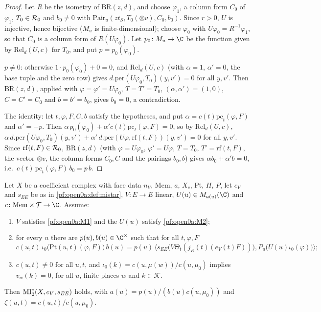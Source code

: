 \begin{proof}
Let $R$ be the isometry of $\mathrm{BR}(z,d)$, and choose $\varphi_1$, a column form $C_0$ of $\varphi_1$,
$T_0\in\mathcal{R}_0$ and $b_0\ne0$ with $\mathrm{Pair}_u(zt_S,T_0(\otimes v),C_0,b_0)$. Since $r>0$, $U$ is injective,
hence bijective ($M_u$ is finite-dimensional); choose $\varphi_0$ with $U\varphi_0=R^{-1}\varphi_1$, so that $C_0$ is a
column form of $R(U\varphi_0)$. Let $p_0\colon M_u\to\C$ be the function given by $\mathrm{Rel}_d(U,c)$ for $T_0$, and
put $p=p_0(\varphi_0)$.

$p\ne0$: otherwise $1\cdot p_0(\varphi_0)+0=0$, and $\mathrm{Rel}_d(U,c)$ (with $\alpha=1$, $\alpha'=0$, the base tuple
and the zero row) gives $d.\mathrm{per}(U\varphi_0,T_0)(y,v')=0$ for all $y,v'$. Then $\mathrm{BR}(z,d)$, applied with
$\varphi=\varphi'=U\varphi_0$, $T=T'=T_0$, $(\alpha,\alpha')=(1,0)$, $C=C'=C_0$ and $b=b'=b_0$, gives $b_0=0$, a
contradiction.

The identity: let $t,\varphi,F,C,b$ satisfy the hypotheses, and put $\alpha=c(t)\mathrm{pc}_t(\varphi,F)$ and
$\alpha'=-p$. Then $\alpha\,p_0(\varphi_0)+\alpha'c(t)\mathrm{pc}_t(\varphi,F)=0$, so by $\mathrm{Rel}_d(U,c)$,
$\alpha\,d.\mathrm{per}(U\varphi_0,T_0)(y,v')+\alpha'\,d.\mathrm{per}(U\varphi,\mathrm{rf}(t,F))(y,v')=0$ for all $y,v'$.
Since $\mathrm{rf}(t,F)\in\mathcal{R}_0$, $\mathrm{BR}(z,d)$ (with $\varphi=U\varphi_0$, $\varphi'=U\varphi$, $T=T_0$,
$T'=\mathrm{rf}(t,F)$, the vector $\otimes v$, the column forms $C_0,C$ and the pairings $b_0,b$) gives
$\alpha b_0+\alpha'b=0$, i.e.\ $c(t)\,\mathrm{pc}_t(\varphi,F)\,b_0=p\,b$.
\end{proof}

\begin{lemma}[Normalisation]\label{pf:open0a:anchored}
Let $X$ be a coefficient complex with face data $n_V$, $\mathrm{Mem}$, $a$, $X_c$, $\mathrm{Pt}$, $H$, $P$, let $e_V$
and $s_{EE}$ be as in \cref{pf:open0a:def:mistar}, $V\colon E\to E$ linear, $U(u)\in M_{a(u)}(\C)$ and
$c\colon\mathrm{Mem}\times\mathcal T\to\C$. Assume:
\begin{enumerate}[label=(\roman*)]
\item $V$ satisfies \ref{pf:open0a:M1} and the $U(u)$ satisfy \ref{pf:open0a:M2};
\item for every $u$ there are $p(u),b(u)\in\C^\times$ such that for all $t,\varphi,F$
\[
c(u,t)\,\iota_0\bigl(\mathrm{Pt}(u,t)(\varphi,F)\bigr)\,b(u)
=p(u)\,\bigl\langle s_{EE}\bigl(V\Theta_t(j_R(t)(e_V(t)F))\bigr),P_u\bigl(U(u)\iota_0(\varphi)\bigr)\bigr\rangle;
\]
\item $c(u,t)\ne0$ for all $u,t$, and $\iota_0(k)=c(u,\mu(w))/c(u,\mu_0)$ implies $v_w(k)=0$, for all $u$, finite places
$w$ and $k\in\mathcal{K}$.
\end{enumerate}
Then $\mathrm{MI}^{*}_{2}(X,e_V,s_{EE})$ holds, with $a(u)=p(u)/(b(u)c(u,\mu_0))$ and $\zeta(u,t)=c(u,t)/c(u,\mu_0)$.
\end{lemma}

